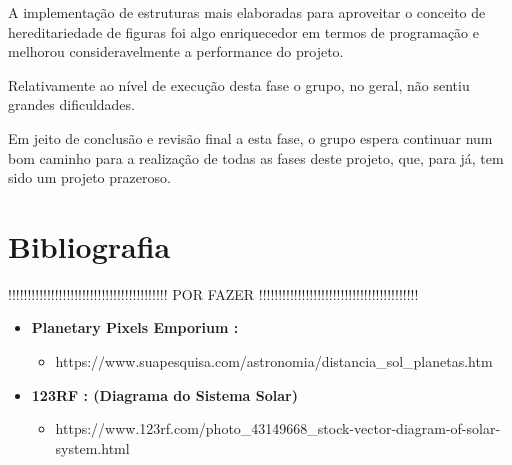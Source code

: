 \documentclass[a4paper]{article}
\begin{document}
A implementação de estruturas mais elaboradas para aproveitar o conceito de hereditariedade de figuras foi algo enriquecedor em termos de programação e melhorou consideravelmente a performance do projeto. 

Relativamente ao nível de execução desta fase o grupo, no geral, não sentiu grandes dificuldades.

Em jeito de conclusão e revisão final a esta fase, o grupo espera continuar num bom caminho para a realização de todas as fases deste projeto, que, para já, tem sido um projeto prazeroso.

\section{Bibliografia}
\label{sec:bibliografia}

!!!!!!!!!!!!!!!!!!!!!!!!!!!!!!!!!!!!!!!!! POR FAZER !!!!!!!!!!!!!!!!!!!!!!!!!!!!!!!!!!!!!!!!!

\begin{itemize}

  \item \textbf{Planetary Pixels Emporium :}
  \begin{itemize}
    \item https://www.suapesquisa.com/astronomia/distancia\_sol\_planetas.htm
  \end{itemize}
  \item \textbf{123RF : (Diagrama do Sistema Solar)}
  \begin{itemize}
    \item https://www.123rf.com/photo\_43149668\_stock-vector-diagram-of-solar-system.html
  \end{itemize}


\end{itemize}
\end{document}

